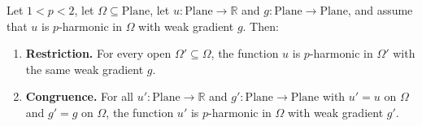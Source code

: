 \begin{lemma}
Let $1<p<2$, let $\Omega\subseteq\mathrm{Plane}$, let $u\colon\mathrm{Plane}\to\mathbb{R}$ and
$g\colon\mathrm{Plane}\to\mathrm{Plane}$, and assume that $u$ is $p$-harmonic in $\Omega$ with
weak gradient $g$.  Then:
\begin{enumerate}
\item[(a)] \textbf{Restriction.}  For every open $\Omega'\subseteq\Omega$, the function $u$ is
$p$-harmonic in $\Omega'$ with the same weak gradient $g$.
\item[(b)] \textbf{Congruence.}  For all $u'\colon\mathrm{Plane}\to\mathbb{R}$ and
$g'\colon\mathrm{Plane}\to\mathrm{Plane}$ with $u'=u$ on $\Omega$ and $g'=g$ on $\Omega$, the
function $u'$ is $p$-harmonic in $\Omega$ with weak gradient $g'$.
\end{enumerate}
\end{lemma}
